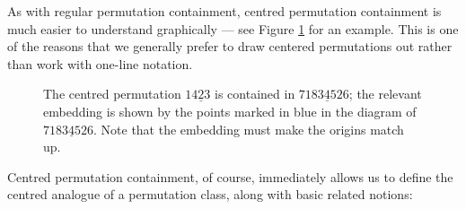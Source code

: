 \documentclass[11pt,a4paper]{article}
\newcommand{\plotptradius}{4pt}
\theoremstyle{definition}
\begin{document}
As with regular permutation containment, centred permutation containment is much easier to understand graphically --- see Figure \ref{fig:centcont} for an example. This is one of the reasons that we generally prefer to draw centered permutations out rather than work with one-line notation.

\begin{figure}[h]
\begin{center}
\end{center}
\caption{The centred permutation $14\underline{2}3$ is contained in $7183\underline{4}526$; the relevant embedding is shown by the points marked in blue in the diagram of $7183\underline{4}526$. Note that the embedding must make the origins match up.}
\label{fig:centcont}
\end{figure}

Centred permutation containment, of course, immediately allows us to define the centred analogue of a permutation class, along with basic related notions:
\end{document}
